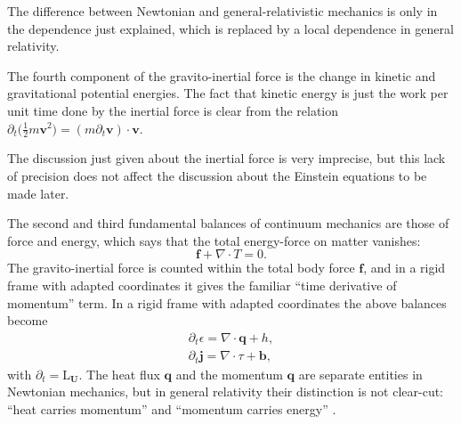 \documentclass[\ifafour a4paper,12pt,\else a5paper,10pt,\fi%
onecolumn,oneside,article,%
british%
]{memoir}
\theoremstyle{remark}
\theoremstyle{innote}
\newcommand*{\citep}{\parencites}
\newcommand*{\de}{\partialup}%
\newcommand*{\di}{\mathrm{d}}%
\renewcommand*{\|}{\nonscript\,\vert\nonscript\;\mathopen{}}
\newcommand*{\Li}{\mathrm{L}}
\newcommand*{\yjj}{p}
\newcommand*{\yj}{\bm{\yjj}}
\newcommand*{\yQ}{h}
\newcommand*{\yqq}{q}
\newcommand*{\yq}{\bm{\yqq}}
\newcommand*{\yTT}{\tau}
\newcommand*{\yT}{\bm{\yTT}}
\newcommand*{\yTTf}{T}
\newcommand*{\ybb}{f}
\newcommand*{\yb}{\bm{\ybb}}
\newcommand*{\ybbf}{b}
\newcommand*{\ybf}{\bm{\ybbf}}
\newcommand*{\yvvt}{v}
\newcommand*{\yvt}{\bm{\yvvt}}
\newcommand*{\yFF}{U}
\newcommand*{\yF}{\bm{\yFF}}
\newcommand*{\yff}{f}
\newcommand*{\yf}{\bm{\yff}}
\newcommand*{\ypp}{j}
\newcommand*{\yp}{\bm{\ypp}}
\newcommand*{\yeen}{e}
\renewcommand*{\yen}{\bm{\yeen}}
\newcommand*{\ye}{\epsilon}
\newcommand*{\ynab}{\nabla}
\begin{document}
The difference between Newtonian and general-relativistic mechanics is only
in the dependence just explained, which is replaced by a local dependence in
general relativity.

The fourth component of the gravito-inertial force is the change in kinetic
and gravitational potential energies. The fact that kinetic energy is just
the work per unit time done by the inertial force is clear from the
relation $\de_t\bigl(\frac{1}{2}m\yvt^2\bigr) = (m\de_t\yvt) \cdot \yvt$.

The discussion just given about the inertial force is very imprecise, but
this lack of precision does not affect the discussion about the Einstein
equations to be made later.

\bigskip

The second and third fundamental balances of continuum mechanics are those
of force and energy, which says that the total energy-force on matter vanishes:
\begin{equation}
  \label{eq:force_balance}
  \yb + \ynab\cdot\yTTf = 0.
\end{equation}
The gravito-inertial force is counted within the total body force $\yb$,
and in a rigid frame with adapted coordinates it gives the familiar
\enquote{time derivative of momentum} term. In a rigid frame with adapted
coordinates the above balances become
\begin{gather}
  \label{eq:energy_balance_newtonian}
  \de_t \ye = \ynab\cdot\yq + \yQ,
  \\
  \de_t\yp = \ynab\cdot\yTT + \ybf,
\end{gather}
with $\de_t = \Li_{\yF}$. The heat flux $\yq$ and the momentum $\yq$ are
separate entities in Newtonian mechanics, but in general relativity their
distinction is not clear-cut: \enquote{heat carries momentum} and
\enquote{momentum carries energy} \citep{eckart1940c}.




\end{document}
